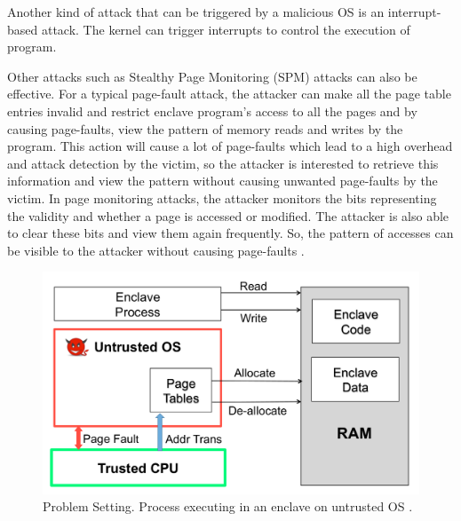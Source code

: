 Another kind of attack that can be triggered by a malicious OS is an interrupt-based attack. The kernel can trigger interrupts to control the execution of program.

Other attacks such as Stealthy Page Monitoring (SPM) attacks \cite{stealthy,leakycauldron} can also be effective. For a typical page-fault attack, the attacker can make all the page table entries invalid and restrict enclave program’s access to all the pages and by causing page-faults, view the pattern of memory reads and writes by the program. This action will cause a lot of page-faults which lead to a high overhead and attack detection by the victim, so the attacker is interested to retrieve this information and view the pattern without causing unwanted page-faults by the victim. In page monitoring attacks, the attacker monitors the bits representing the validity and whether a page is accessed or modified. The attacker is also able to clear these bits and view them again frequently. So, the pattern of accesses can be visible to the attacker without causing page-faults \cite{stealthy,leakycauldron}.


\begin{figure}
	\includegraphics[scale=0.2]{images/uos1}
	\caption{Problem Setting. Process executing in an enclave on untrusted OS \cite{pigeonhole}.}
	\label{fig:uos}
\end{figure}

